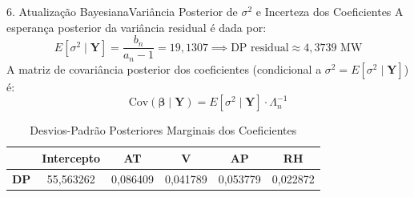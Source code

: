 \documentclass[10pt,aspectratio=169]{beamer}
\begin{document}
\begin{frame}{6. Atualização Bayesiana}{Variância Posterior de $\sigma^2$ e Incerteza dos Coeficientes}
    A esperança posterior da variância residual é dada por:
    $$E[\sigma^2 \mid \mathbf{Y}] = \frac{b_n}{a_n - 1} = 19,1307 \implies \text{DP residual} \approx 4,3739 \text{ MW}$$
    \vspace{0.2cm}
    A matriz de covariância posterior dos coeficientes (condicional a $\sigma^2 = E[\sigma^2 \mid \mathbf{Y}]$) é:
    $$\text{Cov}(\boldsymbol{\beta} \mid \mathbf{Y}) = E[\sigma^2 \mid \mathbf{Y}] \cdot \Lambda_n^{-1}$$
    \begin{table}
        \centering
        \caption{Desvios-Padrão Posteriores Marginais dos Coeficientes}
        \small
        \begin{tabular}{lccccc}
            \toprule
            & \textbf{Intercepto} & \textbf{AT} & \textbf{V} & \textbf{AP} & \textbf{RH} \\
            \midrule
            \textbf{DP} & 55,563262 & 0,086409 & 0,041789 & 0,053779 & 0,022872 \\
            \bottomrule
        \end{tabular}
    \end{table}
\end{frame}
\end{document}
